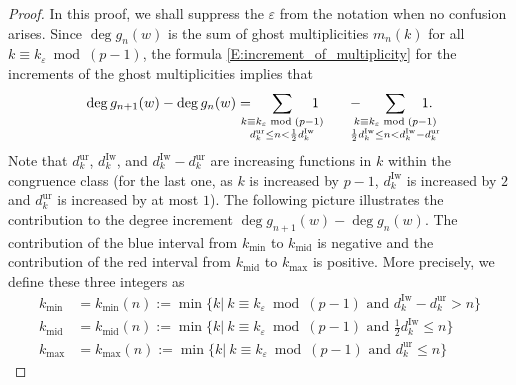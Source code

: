 \begin{proof}
    In this proof, we shall suppress the $\varepsilon$ from the notation when no confusion arises.
    Since $\deg g_n(w)$ is the sum of ghost multiplicities $m_n(k)$ for all $k \equiv k_\varepsilon \bmod{(p-1)}$, the formula \eqref{E:increment_of_multiplicity} for the increments of the ghost multiplicities implies that
    \begin{equation}
    \label{E:gn_plus_1_-_gn}
    \deg g_{n+1} (w) - \deg g_n(w) = \hspace{-10pt}
    \sum_{\substack{k \equiv k_\varepsilon \bmod{(p-1)}
    \\
    d_{k}^{\mathrm{ur}}\leq n < \frac 12 d_{k}^{\mathrm{Iw}}}}
    \hspace{-10pt}1\qquad -  \hspace{-10pt} \sum_{\substack{k \equiv k_\varepsilon \bmod{(p-1)}
    \\
    \frac 12 d_{k}^{\mathrm{Iw}}\leq n < d_{k}^{{\mathrm{Iw}}} - d_{k}^{\mathrm{ur}}}}
    \hspace{-15pt}1.
    \end{equation}
    Note that $d_{k}^{\mathrm{ur}}$, $d_{k}^{\mathrm{Iw}}$, and $ d_{k}^{{\mathrm{Iw}}} - d_{k}^{\mathrm{ur}}$ are increasing functions in $k$ within the congruence class (for the last one, as $k$ is increased by $p-1$, $d_{k}^{\mathrm{Iw}}$ is increased by $2$ and $d_{k}^{\mathrm{ur}}$ is increased by at most $1$).
    The following picture illustrates the contribution to the degree increment $\deg g_{n+1}(w) -\deg g_n(w)$. The contribution of the blue interval from $k_{\min}$ to $k_{\mathrm{mid}}$ is negative and the contribution of the red interval from $k_{\mathrm{mid}}$ to $k_{\max}$ is positive. More precisely, we define these three integers as
    \begin{align}\label{E:first_definition_of_extremal_ks}
    k_{\min}&=k_{\min}(n):=\min\{k|~k\equiv k_\varepsilon \bmod (p-1) \text{~and~} d_k^{\mathrm{Iw}}-d_k^{\mathrm{ur}}>n \}\\
    k_{{\mathrm{mid}}}&=k_{{\mathrm{mid}}}(n):=\min\{k|~k\equiv k_\varepsilon \bmod (p-1) \text{~and~} \frac 12 d_k^{\mathrm{Iw}}\leq n \}\nonumber\\
    k_{\max}&=k_{\max}(n):=\min\{k|~k\equiv k_\varepsilon \bmod (p-1) \text{~and~} d_k^{\mathrm{ur}}\leq n \}\nonumber

\end{align}
\end{proof}
